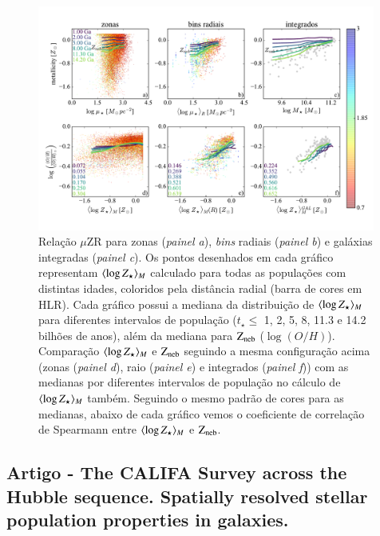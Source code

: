 \begin{figure}
	\centering
	\includegraphics[width=0.99\textwidth]{figuras/stellar_muZR_realsample.pdf}
	\caption[Relação $\mu$ZR e comparação entre as metalicidades]
	{Relação $\mu$ZR para zonas ({\em painel a}), {\em bins} radiais ({\em painel b}) e galáxias
integradas ({\em painel c}). Os pontos desenhados em cada gráfico representam $\meanM{\log Z_\star}$
calculado para todas as populações com distintas idades, coloridos pela distância radial (barra de
cores em HLR). Cada gráfico possui a mediana da distribuição de $\meanM{\log Z_\star}$ para
diferentes intervalos de população ($t_\star \leq$ 1, 2, 5, 8, 11.3 e 14.2 bilhões de anos), além
da mediana para $\mathrm{Z}_{\mathrm{neb}}$ ($\log(O/H)$). Comparação $\meanM{\log Z_\star}$ e
$\mathrm{Z}_{\mathrm{neb}}$ seguindo a mesma configuração acima (zonas ({\em painel d}), raio ({\em painel e}) e
integrados ({\em painel f})) com as medianas por diferentes intervalos de população no cálculo de
$\meanM{\log Z_\star}$ também. Seguindo o mesmo padrão de cores para as medianas, abaixo de cada
gráfico vemos o coeficiente de correlação de Spearmann entre $\meanM{\log Z_\star}$ e $\mathrm{Z}_{\mathrm{neb}}$.}
	\label{fig:ZstarvsZneb}
\end{figure}

\subsection{Artigo - The CALIFA Survey across the Hubble sequence. Spatially resolved stellar
population properties in galaxies.}

